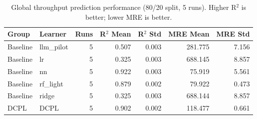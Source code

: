 \begin{table}[t]
\centering
\small
\setlength{\tabcolsep}{6pt}
\renewcommand{\arraystretch}{1.2}
\begin{tabular}{llrrrrr}
\toprule
\textbf{Group} & \textbf{Learner} & \textbf{Runs} &
\textbf{R$^2$ Mean} & \textbf{R$^2$ Std} &
\textbf{MRE Mean} & \textbf{MRE Std} \\
\midrule
Baseline & llm\_pilot & 5 & 0.507 & 0.003 & 281.775 & 7.156 \\
Baseline & lr         & 5 & 0.325 & 0.003 & 688.145 & 8.857 \\
Baseline & nn         & 5 & 0.922 & 0.003 & 75.919  & 5.561 \\
Baseline & rf\_light  & 5 & 0.879 & 0.002 & 79.922  & 0.473 \\
Baseline & ridge      & 5 & 0.325 & 0.003 & 688.144 & 8.857 \\
\midrule
DCPL     & DCPL       & 5 & 0.902 & 0.002 & 118.477 & 0.661 \\
\bottomrule
\end{tabular}
\caption{Global throughput prediction performance (80/20 split, 5 runs).
Higher R$^2$ is better; lower MRE is better.}
\label{tab:global_baseline_vs_dcpl_mean_std}
\end{table}
